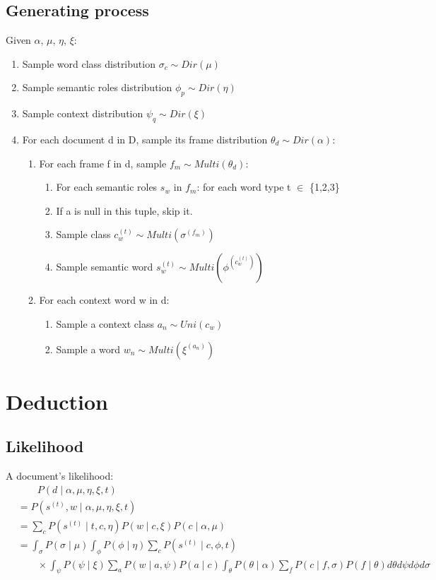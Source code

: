 \documentclass{article}
\begin{document}
\subsection{Generating process}
Given $\alpha$, $\mu$, $\eta$, $\xi$:
\begin{enumerate}
  \item Sample word class distribution $\sigma_c \sim Dir(\mu)$
  \item Sample semantic roles distribution $\phi_p \sim Dir(\eta)$
  \item Sample context distribution $\psi_q \sim Dir(\xi)$
  \item For each document d in D, sample its frame distribution $\theta_d \sim Dir(\alpha)$:
  \begin{enumerate}
  	\item For each frame f in d, sample $f_m \sim Multi(\theta_d)$:
  	\begin{enumerate}
  	 \item For each semantic roles $s_w$ in $f_m$: for each word type t $\in$ \{1,2,3\}
  	 \item If a is null in this tuple, skip it.
  	 \item Sample class $c_w^{(t)} \sim Multi(\sigma^{(f_m)})$
  	 \item Sample semantic word $s_w^{(t)} \sim Multi(\phi^{(c_w^{(t)})})$
  	 \end{enumerate}
  	 \item For each context word w in d:
  	 \begin{enumerate}
  	 \item Sample a context class $a_n \sim Uni(c_w)$
  	 \item Sample a word $w_n \sim Multi(\xi^{(a_n)})$
  	 \end{enumerate}
  \end{enumerate}
\end{enumerate}


\section{Deduction}

\subsection{Likelihood}
A document's likelihood:
\begin{align}
& \qquad P(d \mid \alpha, \mu, \eta, \xi, t) \\
&= P(s^{(t)}, w \mid \alpha, \mu, \eta, \xi, t) \\
&= \sum_c P(s^{(t)} \mid t, c, \eta)  P(w \mid c, \xi)  P(c \mid \alpha, \mu) \\
&=  \int_{\sigma} P(\sigma \mid \mu) \int_{\phi} P(\phi \mid \eta)  \sum_c P(s^{(t)} \mid c, \phi, t) \\  
&\qquad \times  \int_{\psi} P(\psi \mid \xi) \sum_a P(w \mid a, \psi) P(a\mid c)\int_{\theta} P(\theta \mid \alpha) \sum_f P(c \mid f, \sigma) P(f\mid\theta)d\theta  d\psi d\phi d\sigma  \nonumber
\end{align}
\end{document}

